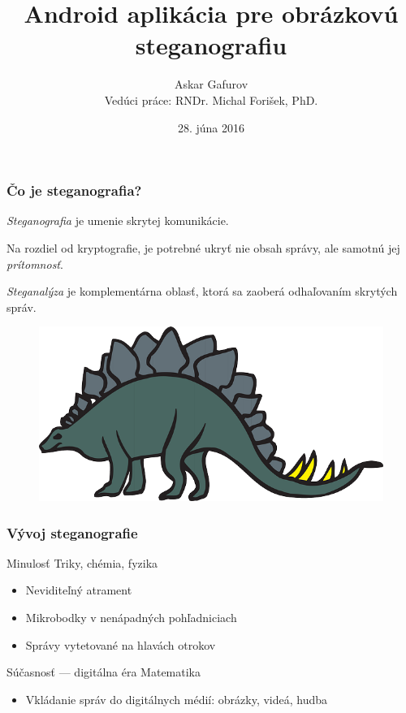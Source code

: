 \documentclass{beamer}
\title[JPEG Steganografia]{Android aplikácia pre obrázkovú steganografiu} %
\author[Askar Gafurov]{Askar Gafurov\\ {\scriptsize  Vedúci práce: RNDr. Michal Forišek, PhD.}} %
\institute[FMFI UK] %
{
Fakulta matematiky, fyziky a informatiky\\
Univerzita Komenského v Bratislave \\
\medskip
\url{ksp.sk/~askar} %
}
\date{28. júna 2016} %
\begin{document}
\begin{frame}
\titlepage %
\end{frame}


\begin{frame}
\frametitle{Čo je steganografia?}
\begin{block}{}
\textit{Steganografia} je umenie skrytej komunikácie.

Na rozdiel od kryptografie, je potrebné ukryť nie obsah správy, ale samotnú jej \textit{prítomnosť}.
\end{block}

\begin{block}{}
\textit{Steganalýza} je komplementárna oblasť, ktorá sa zaoberá odhaľovaním skrytých správ.
    
\end{block}

\begin{figure}
\includegraphics[height=0.2\textheight]{images/stegosaurus.png}
\end{figure}
\end{frame}

\begin{frame}
    \frametitle{Vývoj steganografie}
    \begin{block}{Minulosť}
        Triky, chémia, fyzika
        \begin{itemize}
            \item Neviditeľný atrament
            \item Mikrobodky v nenápadných pohľadniciach
            \item Správy vytetované na hlavách otrokov
        \end{itemize}
    \end{block}
    \begin{block}{Súčasnosť --- digitálna éra}
        Matematika
        \begin{itemize}
            \item Vkládanie správ do digitálnych médií: obrázky, videá, hudba
        \end{itemize}
    \end{block}
\end{frame}
\end{document}
